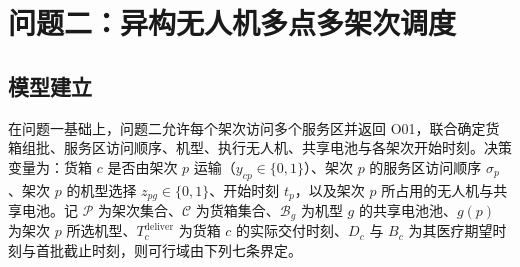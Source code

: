 \section{问题二：异构无人机多点多架次调度}

\subsection{模型建立}

在问题一基础上，问题二允许每个架次访问多个服务区并返回 O01，联合确定货箱组批、服务区访问顺序、机型、执行无人机、共享电池与各架次开始时刻。决策变量为：货箱 $c$ 是否由架次 $p$ 运输（$y_{cp}\in\{0,1\}$）、架次 $p$ 的服务区访问顺序 $\sigma_p$、架次 $p$ 的机型选择 $z_{pg}\in\{0,1\}$、开始时刻 $t_p$，以及架次 $p$ 所占用的无人机与共享电池。记 $\mathcal{P}$ 为架次集合、$\mathcal{C}$ 为货箱集合、$\mathcal{B}_g$ 为机型 $g$ 的共享电池池、$g(p)$ 为架次 $p$ 所选机型、$T^{\mathrm{deliver}}_c$ 为货箱 $c$ 的实际交付时刻、$D_c$ 与 $B_c$ 为其医疗期望时刻与首批截止时刻，则可行域由下列七条界定。

